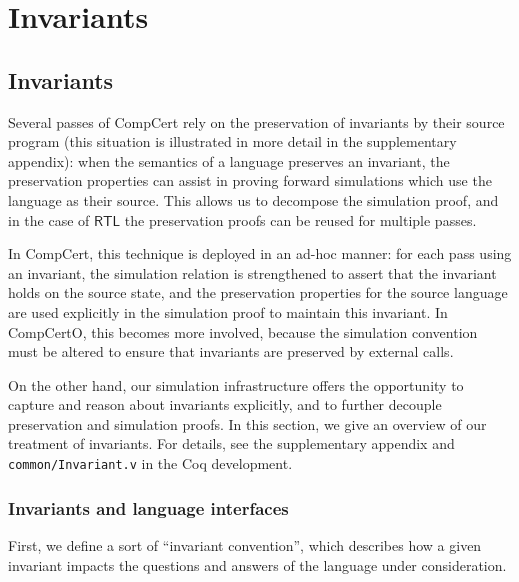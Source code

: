 \documentclass[draft,11pt]{report}
\newcommand{\kw}[1]{\ensuremath{ \mathsf{#1} }}
\begin{document}



\chapter{Invariants} %

\section{Invariants} \label{sec:inv} %


Several passes of CompCert
rely on the preservation of invariants
by their source program
(this situation is illustrated in more detail in the supplementary
appendix):
when the semantics of a language preserves an invariant,
the preservation properties can assist
in proving forward simulations
which use the language as their source.
This allows us to decompose the simulation proof,
and in the case of $\kw{RTL}$
the preservation proofs can be reused for multiple passes.

In CompCert,
this technique is deployed in an ad-hoc manner:
for each pass using an invariant,
the simulation relation is strengthened to assert that
the invariant holds on the source state,
and the preservation properties for the source language
are used explicitly in the simulation proof
to maintain this invariant.
In CompCertO,
this becomes more involved,
because the simulation convention must be altered
to ensure that invariants are preserved
by external calls.

On the other hand,
our simulation infrastructure offers the opportunity
to capture and reason about invariants explicitly,
and to further decouple preservation and simulation proofs.
In this section,
we give an overview of our treatment of invariants.
For details,
see the supplementary appendix and
\texttt{common/Invariant.v}
in the Coq development.


\subsection{Invariants and language interfaces} %

First, we define a sort of ``invariant convention'',
which describes how a given invariant impacts the questions and answers
of the language under consideration.
\end{document}

